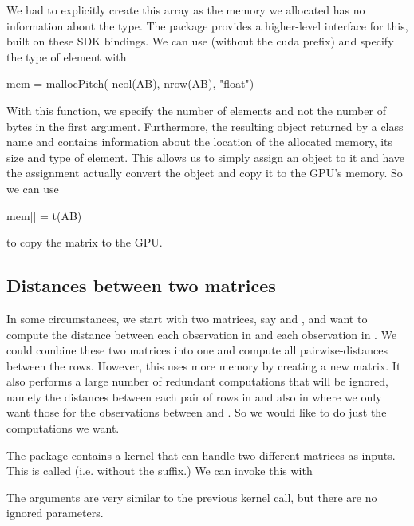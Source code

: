 We had to explicitly create this array as the memory we allocated
has no information about the type.
The  package provides a higher-level interface
for this, built on these SDK bindings.
We can use  (without the cuda prefix)
and specify the type of element with
\begin{RCode}
mem = mallocPitch( ncol(AB), nrow(AB), "float")
\end{RCode}
With this function, we specify the number of elements and not the
number of bytes in the first argument.  Furthermore, the resulting
object returned by  a class name 
and contains information about the location of the allocated memory,
its size and type of element.
This allows us to simply assign an \R{}  object to it and
have the assignment actually convert the \R{} object and copy it
to the GPU's memory.
So we can use
\begin{RCode}
mem[] = t(AB)
\end{RCode}
to copy the matrix to the GPU.




\subsection{Distances between two matrices}
In some circumstances, we start with two matrices, say  and
, and want to compute the distance between each observation in
 and each observation in .  We could combine these two
matrices into one and compute all pairwise-distances between the
rows. However, this uses more memory by creating a new matrix.  It
also performs a large number of redundant computations that will be
ignored, namely the distances between each pair of rows in 
and also in  where we only want those for the observations
between  and .
So we would like to do just the computations we want.

The  package contains a kernel that can handle two
different matrices as inputs.  This is called
 (i.e. without the  suffix.)
We can invoke this with 
The arguments are very similar to the previous kernel call,
but there are no ignored parameters.

